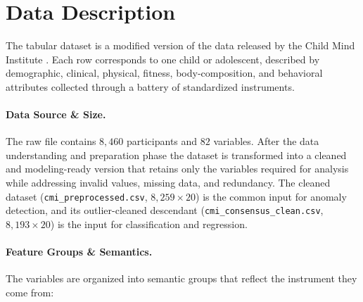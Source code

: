 \section{Data Description}

The tabular dataset is a modified version of the data released by the Child Mind Institute \cite{cmi}. Each row corresponds to one child or adolescent, described by demographic, clinical, physical, fitness, body-composition, and behavioral attributes collected through a battery of standardized instruments.\\

\paragraph{Data Source \& Size.} The raw file contains $8{,}460$ participants and $82$ variables. After the data understanding and preparation phase the dataset is transformed into a cleaned and modeling-ready version that retains only the variables required for analysis while addressing invalid values, missing data, and redundancy. The cleaned dataset (\texttt{cmi\_preprocessed.csv}, $8{,}259 \times 20$) is the common input for anomaly detection, and its outlier-cleaned descendant (\texttt{cmi\_consensus\_clean.csv}, $8{,}193 \times 20$) is the input for classification and regression.\\

\paragraph{Feature Groups \& Semantics.} The variables are organized into semantic groups that reflect the instrument they come from:

